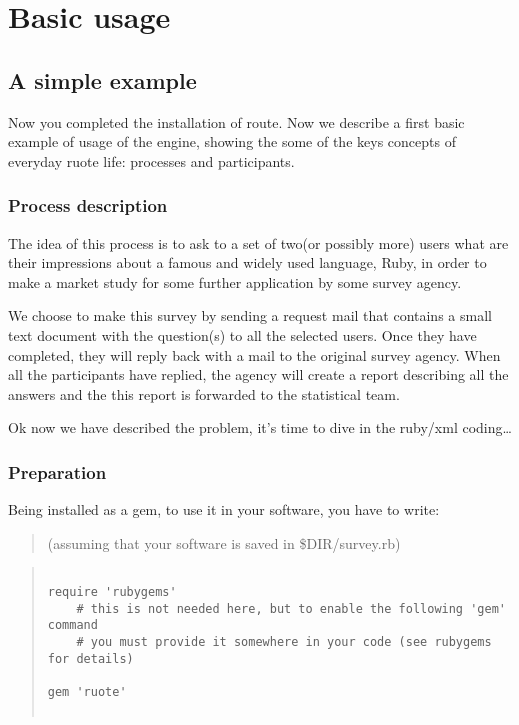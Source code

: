 
\chapter{Basic usage}

\section{A simple example}

Now you completed the installation of route. Now we describe a first basic
example of usage of the engine, showing the some of the keys concepts of
everyday ruote life: processes and participants. 

    \subsection{Process description}
        The idea of this process is to ask to a set of two(or possibly more) users what 
        are their impressions about a famous and widely used language, Ruby, in order to 
        make a market study for some further application by some survey agency.

        We choose to make this survey by sending a request mail that contains a small 
        text document with the question(s) to all the selected users. Once they have
        completed, they will reply back with a mail to the original survey agency. When
        all the participants have replied, the agency will create a report describing all
        the answers and the this report is forwarded to the statistical team.

        Ok now we have described the problem, it's time to dive in the ruby/xml coding\ldots

    \subsection{Preparation}

        Being installed as a gem, to use it in your software, you have to write:

        \begin{quote}
        \small{(assuming that your software is saved in \$DIR/survey.rb)}
        \end{quote}

        \begin{quote}
        \begin{verbatim}
        
require 'rubygems' 
    # this is not needed here, but to enable the following 'gem' command
    # you must provide it somewhere in your code (see rubygems for details)

gem 'ruote'
        
        \end{verbatim}
        \end{quote}

